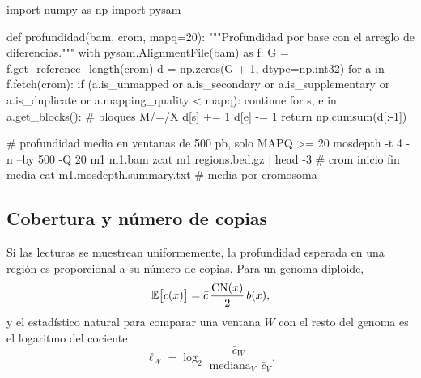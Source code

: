 \begin{codigo}[profundidad.py]
import numpy as np
import pysam

def profundidad(bam, crom, mapq=20):
    """Profundidad por base con el arreglo de diferencias."""
    with pysam.AlignmentFile(bam) as f:
        G = f.get_reference_length(crom)
        d = np.zeros(G + 1, dtype=np.int32)
        for a in f.fetch(crom):
            if (a.is_unmapped or a.is_secondary or a.is_supplementary
                    or a.is_duplicate or a.mapping_quality < mapq):
                continue
            for s, e in a.get_blocks():         # bloques M/=/X
                d[s] += 1
                d[e] -= 1
    return np.cumsum(d[:-1])
\end{codigo}

\begin{consola}
# profundidad media en ventanas de 500 pb, solo MAPQ >= 20
mosdepth -t 4 -n --by 500 -Q 20 m1 m1.bam
zcat m1.regions.bed.gz | head -3       # crom inicio fin media
cat m1.mosdepth.summary.txt            # media por cromosoma
\end{consola}

\subsection{Cobertura y número de copias}

Si las lecturas se muestrean uniformemente, la profundidad esperada en una región es proporcional a su número de copias. Para un genoma diploide,
\begin{equation}\label{eq:07-cn}
\mathbb{E}\big[c(x)\big] = \bar c\,\frac{\mathrm{CN}(x)}{2}\,b(x),
\end{equation}
y el estadístico natural para comparar una ventana $W$ con el resto del genoma es el logaritmo del cociente
\begin{equation}\label{eq:07-log2}
\ell_W = \log_2\frac{\bar c_W}{\operatorname{mediana}_V\,\bar c_V}.
\end{equation}

\begin{simbolos}
\end{simbolos}


